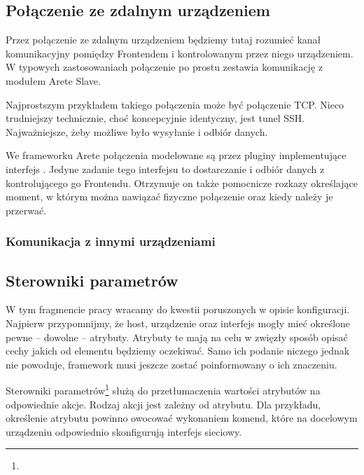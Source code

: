 \documentclass[00-praca-magisterska.tex]{subfiles}
\begin{document}
\subsection{Połączenie ze zdalnym urządzeniem}


Przez połączenie ze zdalnym urządzeniem będziemy tutaj rozumieć kanał
komunikacyjny pomiędzy Frontendem i kontrolowanym przez niego urządzeniem. W
typowych zastosowaniach połączenie po prostu zestawia komunikację z modułem
Arete Slave. 


Najprostszym przykładem takiego połączenia może być połączenie TCP. Nieco
trudniejszy technicznie, choć koncepcyjnie identyczny, jest tunel SSH.
Najważniejsze, żeby możliwe było wysyłanie i odbiór danych.

We frameworku Arete połączenia modelowane są przez pluginy implementujące
interfejs . Jedyne zadanie tego interfejsu to
dostarczanie i odbiór danych z kontrolującego go Frontendu. Otrzymuje on także
pomocnicze rozkazy określające moment, w którym można nawiązać fizyczne
połączenie oraz kiedy należy je przerwać.



\subsubsection{Komunikacja z innymi urządzeniami}

\FIXME{}

\subsection{Sterowniki parametrów}

W tym fragmencie pracy wracamy do kwestii poruszonych w opisie konfiguracji.
Najpierw przypomnijmy, że host, urządzenie oraz interfejs mogły mieć określone
pewne -- dowolne -- atrybuty. Atrybuty te mają na celu w zwięzły sposób opisać
cechy jakich od elementu będziemy oczekiwać. Samo ich podanie niczego jednak nie
powoduje, framework musi jeszcze zostać poinformowany o ich znaczeniu.

Sterowniki parametrów\footnote{} służą do przetłumaczenia
wartości atrybutów na odpowiednie akcje. Rodzaj akcji jest zależny od atrybutu.
Dla przykładu, określenie atrybutu  powinno owocować wykonaniem komend,
które na docelowym urządzeniu odpowiednio skonfigurują interfejs sieciowy.
\end{document}
